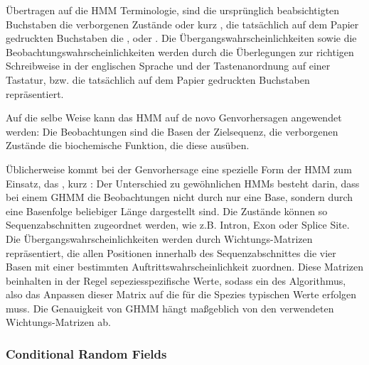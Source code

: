 Übertragen auf die HMM Terminologie, sind die ursprünglich beabsichtigten
Buchstaben die verborgenen Zustände oder kurz , die tatsächlich
auf dem Papier gedruckten Buchstaben die , oder
.
 Die Übergangswahrscheinlichkeiten sowie die Beobachtungswahrscheinlichkeiten
 werden durch die Überlegungen zur richtigen Schreibweise in der englischen
 Sprache und der Tastenanordnung auf einer Tastatur, bzw. die tatsächlich auf
 dem Papier gedruckten Buchstaben repräsentiert.

Auf die selbe Weise kann das HMM auf de novo  Genvorhersagen
angewendet werden:
Die Beobachtungen sind die Basen der Zielsequenz, die verborgenen Zustände die
biochemische Funktion, die diese ausüben.

Üblicherweise kommt bei der Genvorhersage eine spezielle Form der HMM zum
Einsatz, das , kurz :
Der Unterschied zu gewöhnlichen HMMs besteht darin, dass bei einem GHMM die
Beobachtungen nicht durch nur eine Base, sondern durch eine Basenfolge
beliebiger Länge dargestellt sind.
Die Zustände können so Sequenzabschnitten zugeordnet werden, wie z.B. Intron,
Exon oder Splice Site.
Die Übergangswahrscheinlichkeiten werden durch Wichtungs-Matrizen
repräsentiert, die allen Positionen innerhalb des Sequenzabschnittes die vier
Basen mit einer bestimmten Auftrittswahrscheinlichkeit zuordnen.
Diese Matrizen beinhalten in der Regel sepeziesspezifische Werte, sodass ein
 des Algorithmus, also das Anpassen dieser Matrix auf die für die
Spezies typischen Werte erfolgen muss.
Die Genauigkeit von GHMM hängt maßgeblich von den verwendeten
Wichtungs-Matrizen ab.
\citep{pmid16339376, pmid17687368, pmid10779491}

\subsubsection{Conditional Random Fields}
\todo{\dots}